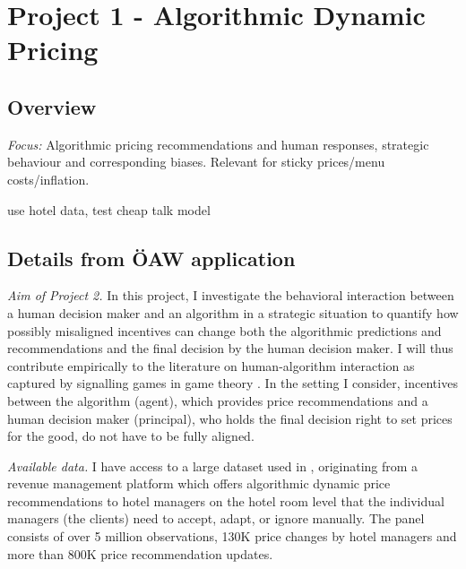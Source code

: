 \documentclass[12pt,a4paper]{article}
\begin{document}
\section{Project 1 - Algorithmic Dynamic Pricing}
\label{sec:1}

\subsection{Overview}
	\emph{Focus:} Algorithmic pricing recommendations and human responses, strategic behaviour and corresponding biases. Relevant for sticky prices/menu costs/inflation.

use hotel data, test cheap talk model

\subsection{Details from ÖAW application}

\emph{Aim of Project 2.} In this project, I investigate the behavioral interaction between a human decision maker and an algorithm in a strategic situation to quantify how possibly misaligned incentives can change both the algorithmic predictions and recommendations and the final decision by the human decision maker. I will thus contribute empirically to the literature on human-algorithm interaction as captured by signalling games in game theory \citep{backus2019empirical}. In the setting I consider, incentives between the algorithm (agent), which provides price recommendations and a human decision maker (principal), who holds the final decision right to set prices for the good, do not have to be fully aligned.

\emph{Available data.} I have access to a large dataset used in \citet{GTW2021demandest}, originating from a revenue management platform which offers algorithmic dynamic price recommendations to hotel managers on the hotel room level that the individual managers (the clients) need to accept, adapt, or ignore manually. The panel consists of over 5 million observations, 130K price changes by hotel managers and more than 800K price recommendation updates.
\end{document}
